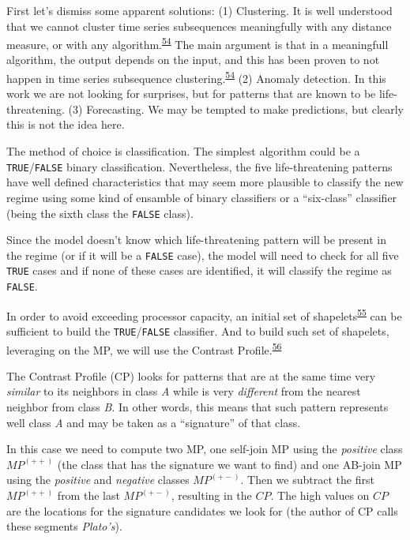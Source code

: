 \documentclass[12pt,twoside]{fmupthesis}
\begin{document}
First let's dismiss some apparent solutions: (1) Clustering. It is well understood that we cannot
cluster time series subsequences meaningfully with any distance measure, or with any algorithm.\textsuperscript{\protect\hyperlink{ref-Keogh2005}{54}} The main argument is that in a meaningfull algorithm, the output depends on the input,
and this has been proven to not happen in time series subsequence clustering.\textsuperscript{\protect\hyperlink{ref-Keogh2005}{54}} (2)
Anomaly detection. In this work we are not looking for surprises, but for patterns that are known to
be life-threatening. (3) Forecasting. We may be tempted to make predictions, but clearly this is not
the idea here.

The method of choice is classification. The simplest algorithm could be a \texttt{TRUE}/\texttt{FALSE} binary
classification. Nevertheless, the five life-threatening patterns have well defined characteristics
that may seem more plausible to classify the new regime using some kind of ensamble of binary
classifiers or a ``six-class'' classifier (being the sixth class the \texttt{FALSE} class).

Since the model doesn't know which life-threatening pattern will be present in the regime (or if it
will be a \texttt{FALSE} case), the model will need to check for all five \texttt{TRUE} cases and if none of these
cases are identified, it will classify the regime as \texttt{FALSE}.

In order to avoid exceeding processor capacity, an initial set of shapelets\textsuperscript{\protect\hyperlink{ref-Rakthanmanon2013}{55}} can
be sufficient to build the \texttt{TRUE}/\texttt{FALSE} classifier. And to build such set of shapelets, leveraging
on the MP, we will use the Contrast Profile.\textsuperscript{\protect\hyperlink{ref-Mercer2021}{56}}

The Contrast Profile (CP) looks for patterns that are at the same time very \emph{similar} to its
neighbors in class \emph{A} while is very \emph{different} from the nearest neighbor from class \emph{B}. In other
words, this means that such pattern represents well class \emph{A} and may be taken as a ``signature'' of
that class.

In this case we need to compute two MP, one self-join MP using the \emph{positive} class \(MP^{(++)}\) (the
class that has the signature we want to find) and one AB-join MP using the \emph{positive} and \emph{negative}
classes \(MP^{(+-)}\). Then we subtract the first \(MP^{(++)}\) from the last \(MP^{(+-)}\), resulting in
the \(CP\). The high values on \(CP\) are the locations for the signature candidates we look for (the
author of CP calls these segments \emph{Plato's}).
\end{document}
